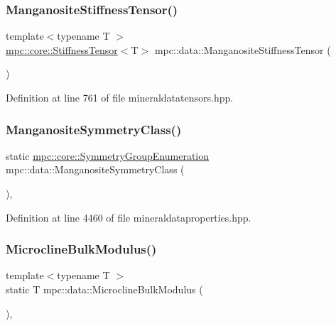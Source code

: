 \subsubsection{\texorpdfstring{Manganosite\+Stiffness\+Tensor()}{ManganositeStiffnessTensor()}}
{\footnotesize\ttfamily template$<$typename T $>$ \\
\mbox{\hyperlink{structmpc_1_1core_1_1_stiffness_tensor}{mpc\+::core\+::\+Stiffness\+Tensor}}$<$T$>$ mpc\+::data\+::\+Manganosite\+Stiffness\+Tensor (\begin{DoxyParamCaption}{ }\end{DoxyParamCaption})}



Definition at line 761 of file mineraldatatensors.\+hpp.

\mbox{\label{namespacempc_1_1data_a93b096db59d25166a11a1d508477be1c}} 
\subsubsection{\texorpdfstring{Manganosite\+Symmetry\+Class()}{ManganositeSymmetryClass()}}
{\footnotesize\ttfamily static \mbox{\hyperlink{namespacempc_1_1core_a9d979684062547055a0ef5c13077bad8}{mpc\+::core\+::\+Symmetry\+Group\+Enumeration}} mpc\+::data\+::\+Manganosite\+Symmetry\+Class (\begin{DoxyParamCaption}{ }\end{DoxyParamCaption})\hspace{0.3cm}{\ttfamily [inline]}, {\ttfamily [static]}}



Definition at line 4460 of file mineraldataproperties.\+hpp.

\mbox{\label{namespacempc_1_1data_aea7ff85eee5f8c08daa2931e1d0b6377}} 
\subsubsection{\texorpdfstring{Microcline\+Bulk\+Modulus()}{MicroclineBulkModulus()}}
{\footnotesize\ttfamily template$<$typename T $>$ \\
static T mpc\+::data\+::\+Microcline\+Bulk\+Modulus (\begin{DoxyParamCaption}{ }\end{DoxyParamCaption})\hspace{0.3cm}{\ttfamily [inline]}, {\ttfamily [static]}}



